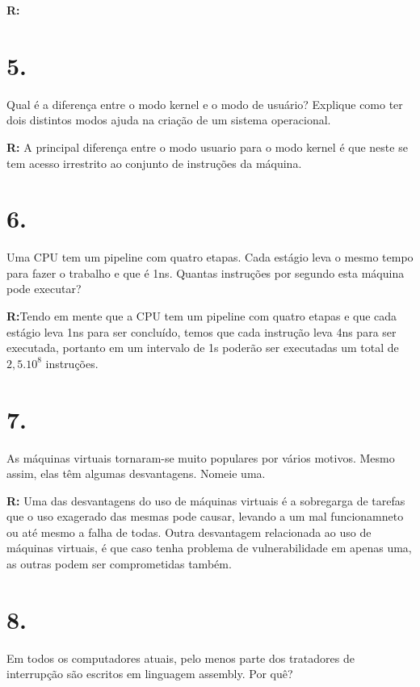 \documentclass{article}
\begin{document}
\medskip
\noindent
\textbf{R:}

\section*{5.}
Qual é a diferença entre o modo kernel e o modo de usuário? Explique como ter dois
distintos modos ajuda na criação de um sistema operacional.

\medskip
\noindent
\textbf{R:} A principal diferença entre o modo usuario para o modo kernel é que neste se tem acesso irrestrito ao conjunto de instruções da máquina.

\section*{6.}
Uma CPU tem um pipeline com quatro etapas. Cada estágio leva o mesmo tempo para
fazer o trabalho e que é 1ns. Quantas instruções por segundo esta máquina pode executar?

\medskip
\noindent
\textbf{R:}Tendo em mente que a CPU tem um pipeline com quatro etapas e que cada estágio leva 1ns para ser concluído, temos que cada instrução leva 4ns para ser executada, portanto em um intervalo de 1s poderão ser executadas um total de $2,5.10^8$ instruções.

\section*{7.}
As máquinas virtuais tornaram-se muito populares por vários motivos. Mesmo assim, elas
têm algumas desvantagens. Nomeie uma.

\medskip
\noindent
\textbf{R:} Uma das desvantagens do uso de máquinas virtuais é a sobregarga de tarefas que o uso exagerado das mesmas pode causar, levando a um mal funcionamneto ou até mesmo a falha de todas. Outra desvantagem relacionada ao uso de máquinas virtuais, é que caso tenha problema de vulnerabilidade em apenas uma, as outras podem ser comprometidas também.

\section*{8.}
Em todos os computadores atuais, pelo menos parte dos tratadores de interrupção são
escritos em linguagem assembly. Por quê?
\end{document}
